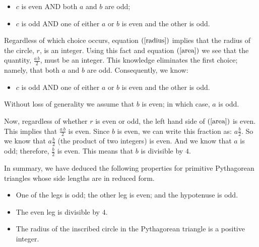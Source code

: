 \documentclass[12pt]{article}
\begin{document}
\begin{itemize}
  \item{$c$ is even AND both $a$ and $b$ are odd;}
  \item{$c$ is odd AND one of either $a$ or $b$ is even and the other is odd.}
\end{itemize}

Regardless of which choice occurs, equation $(\ref{radius})$ implies that 
the radius of the circle, $r$, is an integer.
\eject
Using this fact and equation $(\ref{area})$ we see that the quantity, 
$\frac{a \, b}{2}$, must be an integer. 
This knowledge eliminates the first choice; namely, that both $a$ and $b$ 
are odd. Consequently, we know:
\begin{itemize}
    \item{$c$ is odd AND one of either $a$ or $b$ is even and the other is odd.}
\end{itemize}
Without loss of generality we assume that $b$ is even; in which case, $a$ is odd.

Now, regardless of whether $r$ is even or odd, the left hand side of 
$(\ref{area})$ is even. This implies that $\frac{a \, b}{2}$
is even. Since $b$ is even, we can write this fraction as: $a \frac{b}{2}$.
So we know that $a \frac{b}{2}$ (the product of two integers) is even.
And we know that $a$ is odd; therefore, $\frac{b}{2}$ is even.
This means that $b$ is divisible by $4$.

In summary, we have deduced the following properties for primitive Pythagorean triangles
whose side lengths are in reduced form.
\begin{itemize}
  \item{One of the legs is odd; the other leg is even; and the hypotenuse 
      is odd.}
  \item{The even leg is divisible by $4$.}
  \item{The radius of the inscribed circle in the Pythagorean triangle
      is a positive integer.}
\end{itemize}
\end{document}
